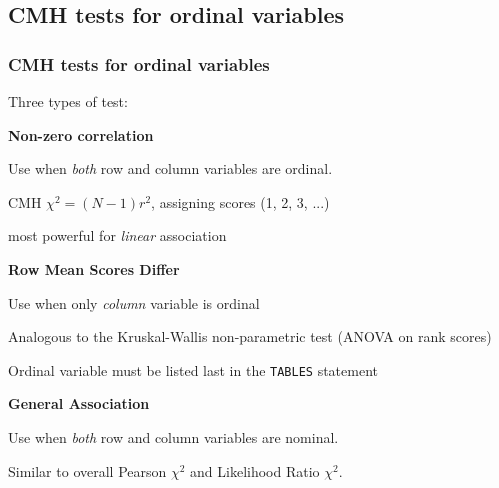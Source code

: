 \subsection{CMH tests for ordinal variables}
\begin{frame}
\frametitle{CMH tests for ordinal variables}
Three types of test:
  \begin{block}{\large\bfseries Non-zero correlation} 
	  \begin{itemize*}
	  \item Use when \emph{both} row and column variables are ordinal.
	  \item CMH \(\chi^2 = ( N - 1) r^2\), assigning scores (1, 2, 3, ...)
	  \item most powerful for \emph{linear} association
	  \end{itemize*}
  \end{block}
  \begin{block}{\large\bfseries Row Mean Scores Differ} 
      \begin{itemize*}
	  \item Use when only \emph{column} variable is ordinal
	  \item Analogous to the Kruskal-Wallis non-parametric test (ANOVA on rank scores)
	  \item Ordinal variable must be listed \alert{last} in the \texttt{TABLES} statement
       \end{itemize*}
  \end{block}
  \begin{block}{\large\bfseries General Association} 
      \begin{itemize*}
	  \item Use when \emph{both} row and column variables are nominal.
	  \item Similar to overall Pearson \(\chi^2\) and Likelihood Ratio \(\chi^2\).
       \end{itemize*}
  \end{block}
\end{frame}

